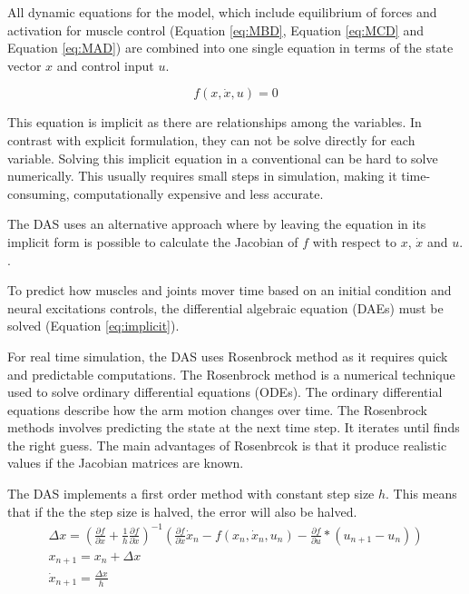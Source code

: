 All dynamic equations for the model, which include equilibrium of forces and activation for muscle control (Equation \ref{eq:MBD}, Equation \ref{eq:MCD} and Equation \ref{eq:MAD}) are combined into one single equation in terms of the state vector $x$ and control input $u$.

\begin{equation} \label{eq:implicit}
    f(x,\dot{x},u)=0
\end{equation}

This equation is implicit as there are relationships among the variables. In contrast with explicit formulation, they can not be solve directly for each variable. Solving this implicit equation in a conventional can be hard to solve numerically. This usually requires small steps in simulation, making it time-consuming, computationally expensive and less accurate.

The DAS uses an alternative approach where by leaving the equation in its implicit form is possible to calculate the Jacobian of $f$ with respect to $x$, $\dot{x}$ and $u$. \cite{IMP}.

To predict how muscles and joints mover time based on an initial condition and neural excitations controls, the differential algebraic equation (DAEs) must be solved (Equation \ref{eq:implicit}). 

For real time simulation, the DAS uses Rosenbrock method as it requires quick and predictable computations. The Rosenbrock method is a numerical technique used to solve ordinary differential equations (ODEs). The ordinary differential equations describe how the arm motion changes over time. The Rosenbrock methods involves predicting the state at the next time step. It iterates until finds the right guess. The main advantages of Rosenbrcok is that it produce realistic values if the Jacobian matrices are known.

The DAS implements a first order method with constant step size $h$. This means that if the the step size is halved, the error will also be halved. 
\begin{equation}
 \begin{aligned}
    \Delta x = (\frac{\partial f}{\partial x} + \frac{1}{h}\frac{\partial f}
    {\partial \dot{x}})^{-1}(\frac{\partial f}{\partial \dot{x}}\dot{x}_n - f(x_n, \dot{x}_n, u_n) - \frac{\partial f}{\partial u}*(u_{n+1} - u_{n}))\\
    x_{n+1} = x_n + \Delta{x} \\
    \dot{x}_{n+1} = \frac{\Delta{x}}{h}
\end{aligned}
\end{equation}





